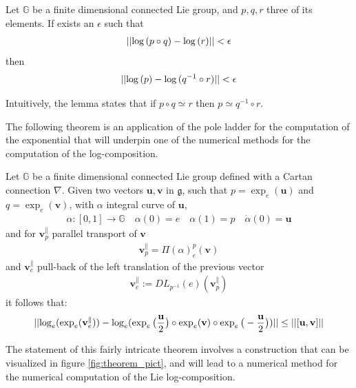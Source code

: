 \begin{lemma}
	Let $\mathbb{G}$ be a finite dimensional connected Lie group, and $p,q,r$ three of its elements. If exists an $\epsilon$ such that 
	\begin{align*}
		\vert\lvert \log{(p\circ q)}  - \log{(r)} \rvert\vert< \epsilon
	\end{align*}
	then
	\begin{align*}
	\vert\lvert \log{(p)}  - \log{(q^{-1} \circ r)} \rvert\vert< \epsilon
	\end{align*}
\end{lemma}
Intuitively, the lemma states that if $p\circ q \simeq r $ then $p \simeq q^{-1} \circ r $.

The following theorem is an application of the pole ladder \cite{lorenzi2011schild} for the computation of the exponential that will underpin one of the numerical methods for the computation of the log-composition.
\begin{theorem}\label{th:local_approximation_theorem}
	Let $\mathbb{G}$ be a finite dimensional connected Lie group defined with a Cartan connection $\nabla$. 
	Given two vectors $\mathbf{u}, \mathbf{v}$ in $\mathfrak{g}$, such that 
	$p = \exp_{e}(\mathbf{u}) $ and	$q = \exp_{e}(\mathbf{v})$, with $\alpha$ integral curve of $\mathbf{u}$,
	\begin{align*}
	\alpha : [0,1] \rightarrow \mathbb{G} \quad \alpha(0) = e  \quad \alpha(1) = p \quad
	\dot{\alpha}(0) = \mathbf{u}
	\end{align*}
	and for $\mathbf{v}_{p}^{\parallel}$ parallel transport of $\mathbf{v}$
	\begin{align*}
	\mathbf{v}_{p}^{\parallel} =  \Pi(\alpha)_{e}^{p}(\mathbf{v})
	\end{align*}
	and $\mathbf{v}_{e}^{\parallel}$ pull-back of the left translation of  the previous vector
	\begin{align*}
	 \mathbf{v}_{e}^{\parallel} := DL_{p^{-1}}(e)( \mathbf{v}_{p}^{\parallel})
	\end{align*}
	it follows that:
	\begin{align*}
		\vert\lvert 
			\log_{e}(\exp_{e}(\mathbf{v}_{e}^{\parallel} ))
			-
			\log_{e}(\exp_{e}\big(\frac{\mathbf{u}}{2}\big)   
				\circ  \exp_{e}(\mathbf{v}) 
				\circ \exp_{e}\big(-\frac{\mathbf{u}}{2}\big))
			 \rvert\vert \leq\vert\lvert [\mathbf{u}, \mathbf{v}] \rvert\vert
	\end{align*}
\end{theorem}
The statement of this fairly intricate theorem involves a construction that can be visualized in figure \ref{fig:theorem_pict}, and will lead to a numerical method for the numerical computation of the Lie log-composition.
